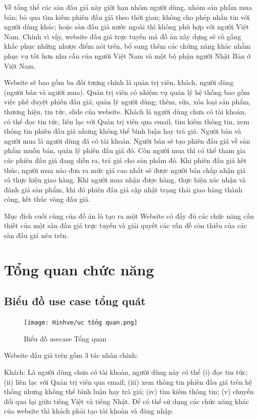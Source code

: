\documentclass[../DoAn.tex]{subfiles}
\begin{document}
Về tổng thể các sàn đấu giá này giới hạn nhóm người dùng, nhóm sản phẩm mua bán; bỏ qua tìm kiếm phiên đấu giá theo thời gian; không cho phép nhắn tin với người dùng khác; hoặc sàn đấu giá nước ngoài thì không phù hợp với người Việt Nam. Chính vì vậy, website đấu giá trực tuyến mà đồ án xây dựng sẽ cố gắng khắc phục những nhược điểm nói trên, bổ sung thêm các chứng năng khác nhằm phục vụ tốt hơn nhu cầu của người Việt Nam và một bộ phận người Nhật Bản ở Việt Nam.

Website sẽ bao gồm ba đối tượng chính là quản trị viên, khách, người dùng (người bán và người mua). Quản trị viên có nhiệm vụ quản lý hệ thống bao gồm việc phê duyệt phiên đấu giá; quản lý người dùng; thêm, sửa, xóa loại sản phẩm, thương hiệu, tin tức, slide của website. Khách là người dùng chưa có tài khoản, có thể đọc tin tức, liên lạc với Quản trị viên qua email, tìm kiếm thông tin, xem thông tin phiên đấu giá nhưng không thể bình luận hay trả giá. Người bán và người mua là người dùng đã có tài khoản. Người bán sẽ tạo phiên đấu giá về sản phẩm muốn bán, quản lý phiên đấu giá đó. Còn người mua thì có thể tham gia các phiên đấu giá đang diễn ra, trả giá cho sản phẩm đó. Khi phiên đấu giá kết thúc, người mua nào đưa ra mức giá cao nhất sẽ được người bán chấp nhận giá và thực hiện giao hàng. Khi người mua nhận được hàng, thực hiện xác nhận và đánh giá sản phẩm, khi đó phiên đấu giá cập nhật trạng thái giao hàng thành công, kết thúc vòng đấu giá.

Mục đích cuối cùng của đồ án là tạo ra một Website có đầy đủ các chức năng cần thiết của một sàn đấu giá trực tuyến và giải quyết các vấn đề còn thiếu của các sàn đấu giá nêu trên.
\section{Tổng quan chức năng}
\label{section:2.2}
\subsection{Biểu đồ use case tổng quát}
\label{subsection:2.2.1}
\begin{figure}[H]
    \centering
    \texttt{[image: Hinhve/uc tổng quan.png]}
    \caption{Biểu đồ usecase Tổng quan}
    \label{fig:Fig21}
\end{figure}
Website đấu giá trên gồm 3 tác nhân chính:

Khách: Là người dùng chưa có tài khoản, người dùng này có thể (i) đọc tin tức; (ii) liên lạc với Quản trị viên qua email; (iii) xem thông tin phiên đấu giá trên hệ thống nhưng không thể bình luận hay trả giá; (iv) tìm kiếm thông tin; (v) chuyển đổi qua lại giữa tiếng Việt và tiếng Nhật. Để có thể sử dụng các chức năng khác của website thì khách phải tạo tài khoản và đăng nhập.
\end{document}
